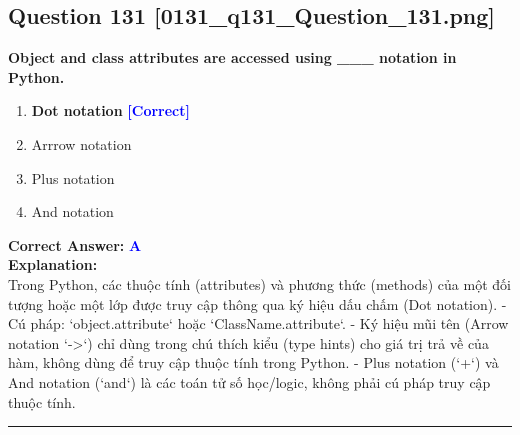 \documentclass[11pt,a4paper]{article}
\begin{document}
\begin{minipage}{\textwidth}
\subsection*{Question 131 \quad \footnotesize{[0131_q131_Question_131.png]}}
\noindent \textbf{Object and class attributes are accessed using ___ notation in Python.}

\begin{enumerate}[label=\Alph*.]
    \item \textbf{Dot notation} \hfill \textcolor{blue}{\textbf{[Correct]}}
    \item Arrrow notation
    \item Plus notation
    \item And notation
\end{enumerate}

\noindent \textbf{Correct Answer:} \textcolor{blue}{\textbf{A}} \\[4pt]
\noindent \textbf{Explanation:}\\
Trong Python, các thuộc tính (attributes) và phương thức (methods) của một đối tượng hoặc một lớp được truy cập thông qua ký hiệu dấu chấm (Dot notation).\newline
- Cú pháp: `object.attribute` hoặc `ClassName.attribute`.\newline
- Ký hiệu mũi tên (Arrow notation `->`) chỉ dùng trong chú thích kiểu (type hints) cho giá trị trả về của hàm, không dùng để truy cập thuộc tính trong Python.\newline
- Plus notation (`+`) và And notation (`and`) là các toán tử số học/logic, không phải cú pháp truy cập thuộc tính.
\end{minipage}
\vspace{0.8cm}
\hrule
\vspace{0.5cm}
\end{document}

